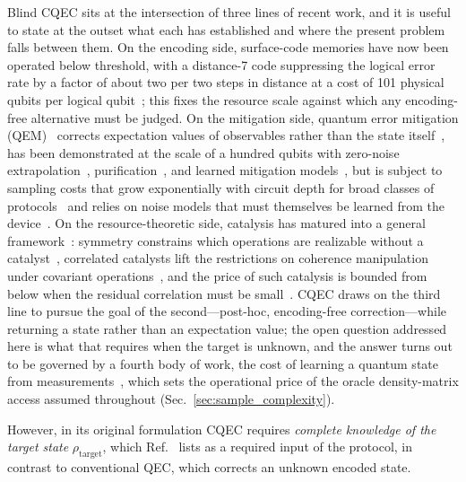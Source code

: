\documentclass[pra,twocolumn,superscriptaddress,longbibliography,floatfix,nofootinbib]{revtex4-2}
\newcommand{\rhot}{\rho_\mathrm{target}}
\begin{document}
Blind CQEC sits at the intersection of three lines of recent work, and it is useful to state at the outset what each has established and where the present problem falls between them.
On the encoding side, surface-code memories have now been operated below threshold, with a distance-7 code suppressing the logical error rate by a factor of about two per two steps in distance at a cost of 101 physical qubits per logical qubit~\cite{GoogleQuantumAI2025belowthreshold}; this fixes the resource scale against which any encoding-free alternative must be judged.
On the mitigation side, quantum error mitigation (QEM)~\cite{Cai2023qem} corrects expectation values of observables rather than the state itself~\cite{vandenBerg2023pec}, has been demonstrated at the scale of a hundred qubits with zero-noise extrapolation~\cite{Kim2023utility}, purification~\cite{OBrien2023purification}, and learned mitigation models~\cite{Liao2024mlqem}, but is subject to sampling costs that grow exponentially with circuit depth for broad classes of protocols~\cite{Takagi2022limits,Quek2024tighter,Tsubouchi2023costbound,Takagi2023sampling} and relies on noise models that must themselves be learned from the device~\cite{vandenBerg2023pec,Huang2023learning}.
On the resource-theoretic side, catalysis has matured into a general framework~\cite{LipkaBartosik2024catalysis,Datta2023catalysis}: symmetry constrains which operations are realizable without a catalyst~\cite{Marvian2022restrictions}, correlated catalysts lift the restrictions on coherence manipulation under covariant operations~\cite{Takagi2022correlation,Kondra2024coherence}, and the price of such catalysis is bounded from below when the residual correlation must be small~\cite{Rubboli2022limits}.
CQEC draws on the third line to pursue the goal of the second---post-hoc, encoding-free correction---while returning a state rather than an expectation value; the open question addressed here is what that requires when the target is unknown, and the answer turns out to be governed by a fourth body of work, the cost of learning a quantum state from measurements~\cite{Elben2023randomized,Anshu2024survey,Chen2023adaptivity}, which sets the operational price of the oracle density-matrix access assumed throughout (Sec.~\ref{sec:sample_complexity}).

However, in its original formulation CQEC requires \emph{complete knowledge of the target state} $\rhot$, which Ref.~\cite{Wakaura2026unified} lists as a required input of the protocol, in contrast to conventional QEC, which corrects an unknown encoded state.
\end{document}
